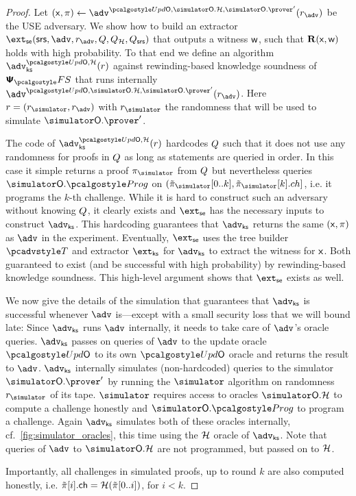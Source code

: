 \begin{proof}	
	Let $(\inp, \zkproof) \gets \advse^{\initU, \simOH, \simOP'}(r_{\advse})$ be the USE adversary. We show how to build an extractor $\extse (\srs, \advse, r_{\advse}, \Qsim, \Qro, \Qsrs)$ that outputs a witness $\mathsf{w}$, such that $\mathbf{R}(\mathsf{x}, \mathsf{w})$ holds with high probability. To that end we define an algorithm $\advcss^{\initU,\ro}(r)$ against rewinding-based knowledge soundness of $\psfs$ that runs internally $\advse^{\initU, \simOH, \simOP'}(r_{\advse})$. Here $r = (\rsim, r_{\advse})$ with $\rsim$ the randomness that will be used to simulate $\simOP'$. 

	The code of $\advcss^{\initU,\ro}(r)$ hardcodes $Q$ such that it does not use any randomness for proofs in $Q$ as long as statements are queried in order. In this case it simple returns a proof $\zkproofs$ from $Q$ but nevertheless queries $\simOHprog$ on $(\tzkproofs[0..k],\tzkproofs[k].ch]$, i.e. it programs the $k$-th challenge. While it is hard to construct such an adversary without knowing $Q$, it clearly exists and $\extse$ has the necessary inputs to construct $\advcss$. This hardcoding guarantees that $\advcss$ returns the same $(\mathsf{x},\pi)$ as $\advse$ in the experiment.
	Eventually, $\extse$ uses the tree builder $\tdv$ and extractor $\extcss$ for $\advcss$ to extract the witness for $\mathsf{x}$. Both guaranteed to exist (and be successful with high probability) by rewinding-based knowledge soundness. This high-level argument shows that $\extse$ exists as well.
	
	We now give the details of the simulation that guarantees that $\advcss$ is successful whenever $\advse$ is---except with a small security loss that we will bound late:
	Since $\advcss$ runs $\advse$ internally, it needs to take care of $\advse$'s oracle queries.
	$\advcss$ passes on queries of $\advse$ to the update oracle $\initU$ to its own $\initU$ oracle and returns the result to $\advse$.
	$\advcss$ internally simulates (non-hardcoded) queries to the simulator $\simOP'$ by running the $\simulator$ algorithm on randomness $\rsim$ of its tape. $\simulator$ requires access to oracles $\simOH$ to compute a challenge honestly and $\simOHprog$ to program a challenge. Again $\advcss$ simulates both of these oracles internally, cf.~\cref{fig:simulator_oracles}, this time using the $\mathcal{H}$ oracle of $\advcss$. 	Note that queries of $\advse$ to $\simOH$ are not programmed, but passed on to $\mathcal{H}$. 
	
	Importantly, all challenges in simulated proofs, up to round $k$ are also computed honestly, i.e. $\tilde{\pi}[i].\mathsf{ch} = \mathcal{H}(\tilde{\pi}[0..i])$, for $i < k$.


\end{proof}
